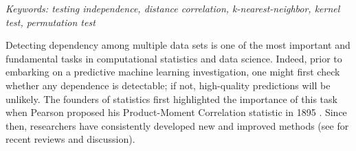 \documentclass[11pt]{article}
\begin{document}
\noindent%
{\it Keywords: testing independence, distance correlation, k-nearest-neighbor, kernel test, permutation test}

\clearpage
\setcounter{tocdepth}{2}%








Detecting dependency among multiple data sets is one of the most important and fundamental tasks in computational statistics and data science.
Indeed, prior to embarking on a predictive machine learning investigation, one might first check whether any dependence is detectable; if not, high-quality predictions will be unlikely.
The founders of statistics first highlighted the importance of this task when Pearson proposed his Product-Moment Correlation statistic in 1895 \cite{Pearson1895}.  Since then, researchers have consistently developed new and improved methods (see \cite{Reimherr2013,JosseHolmes2013} for  recent reviews and discussion).
\end{document}
